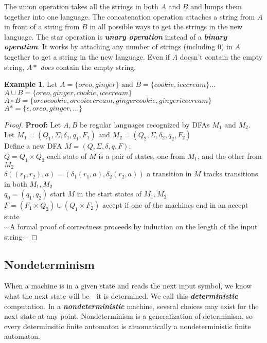 \documentclass{article}
\theoremstyle{definition}
\newtheorem{example}{Example}[section]
\newcommand{\bold}[1]{\textbf{#1}}
\newcommand{\define}[1]{\textbf{\textit{#1}}}
\begin{document}
The union operation takes all the strings in both $A$ and $B$ and lumps them together into one language. The concatenation operation attaches a string from $A$ in front of a string from $B$ in all possible ways to get the strings in the new language. The star operation is \define{unary operation} instead of a \define{binary operation}. It works by attaching any number of strings (including 0) in $A$ together to get a string in the new language. Even if $A$ doesn't contain the empty string, $A*$ \emph{does} contain the empty string. 

\begin{example}
  Let $A = \{oreo,ginger\} \textrm{ and } B = \{cookie,icecream\}$... \\ 
  $A \cup B = \{oreo,ginger,cookie,icecream\}$ \\ 
  $A \circ B = \{oreocookie,oreoicecream,gingercookie,gingericecream\}$ \\ 
  $A* = \{\epsilon,oreo,ginger, \dots\}$ \\
\end{example}

\begin{proof}
  \bold{Proof:} Let $A,B$ be regular languages recognized by DFAs $M_1$ and $M_2$. \\ 
  Let $M_1 = (Q_1, \Sigma, \delta_1, q_1, F_1)$ and $M_2 = (Q_2, \Sigma, \delta_2, q_2, F_2)$ \\ 
  Define a new DFA $M = (Q, \Sigma, \delta, q, F)$: \\ 
  $Q = Q_1 \times Q_2$ \hfill each state of $M$ is a pair of states, one from $M_1$, and the other from $M_2$ \\ 
  $\delta((r_1, r_2),a) = (\delta_1(r_1,a), \delta_2(r_2,a))$ \hfill a transition in $M$ tracks transitions in both $M_1 ,M_2$ \\
  $q_0 = (q_1, q_2)$ \hfill start $M$ in the start states of $M_1, M_2$ \\ 
  $F = (F_1 \times Q_2) \cup (Q_1 \times F_2)$ \hfill accept if one of the machines end in an accept state \\ 
  $\cdots$A formal proof of correctness proceeds by induction on the length of the input string$\cdots$
\end{proof}

\subsection{Nondeterminism}

When a machine is in a given state and reads the next input symbol, we know what the next state will be---it is determined. We call this \define{deterministic} computation. In a \define{nondeterministic} machine, several choices may exist for the next state at any point. Nondeterminism is a generalization of determinism, so every determinsitic finite automaton is atuomatically a nondeterministic finite automaton. \\ 
\end{document}
